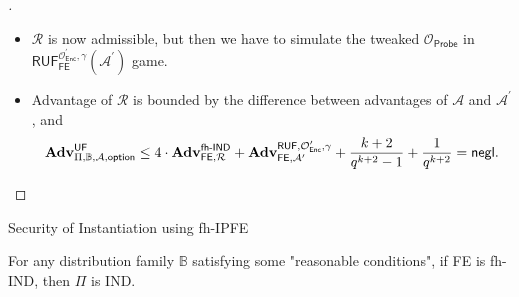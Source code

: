 \begin{frame}{}

\begin{proof}[]

\begin{itemize}
	
	\item<1-> $\mathcal{R}$ is now admissible, but then we have to simulate the tweaked $\mathcal{O}_{\textsf{Probe}}$ in $\textsf{RUF}^{\mathcal{O}^\prime_{\textsf{Enc}}, \gamma}_{\textsf{FE}}(\mathcal{A}^\prime)$ game.

	\item<2-> Advantage of $\mathcal{R}$ is bounded by the difference between advantages of $\mathcal{A}$ and $\mathcal{A}^\prime$, and
	\[
		\mathbf{Adv}^{\textsf{UF}}_{\Pi, \mathbb{B}, \mathcal{A}, \textsf{option}} \leq 4 \cdot \mathbf{Adv}_{\textsf{FE}, \mathcal{R}}^{\textsf{fh-IND}} + \mathbf{Adv}_{\textsf{FE}, \mathcal{A}^\prime}^{\textsf{RUF}, \mathcal{O}^\prime_{\textsf{Enc}}, \gamma} + \frac{k+2}{q^{k+2}-1} + \frac{1}{q^{k+2}} = \mathsf{negl}.
	\]
\end{itemize}
\end{proof}

\end{frame}



\begin{frame}{Security of Instantiation using fh-IPFE}

{}

\begin{theorem}
{}
\end{theorem}


\begin{theorem}
{}
\end{theorem}


\begin{theorem}
	For any distribution family $\mathbb{B}$ satisfying some "reasonable conditions", if \textsf{FE} is fh-IND, then $\Pi$ is IND.
\end{theorem}

\end{frame}


